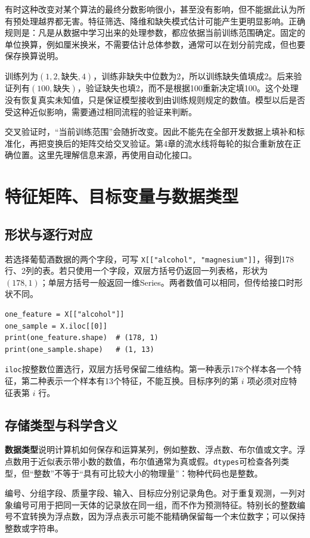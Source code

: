 有时这种改变对某个算法的最终分数影响很小，甚至没有影响，但不能据此认为所有预处理越界都无害。特征筛选、降维和缺失模式估计可能产生更明显影响。正确规则是：凡是从数据中学习出来的处理参数，都应依据当前训练范围确定。固定的单位换算，例如厘米换米，不需要估计总体参数，通常可以在划分前完成，但也要保存换算说明。

训练列为$(1,2,\text{缺失},4)$，训练非缺失中位数为2，所以训练缺失值填成2。后来验证列有$(100,\text{缺失})$，验证缺失也填2，而不是根据100重新决定填100。这个处理没有恢复真实未知值，只是保证模型接收到由训练规则规定的数值。模型以后是否受这种近似影响，需要通过相同流程的验证来判断。

交叉验证时，“当前训练范围”会随折改变。因此不能先在全部开发数据上填补和标准化，再把变换后的矩阵交给交叉验证。第4章的流水线将每轮的拟合重新放在正确位置。这里先理解信息来源，再使用自动化接口。

\section{特征矩阵、目标变量与数据类型}
\subsection{形状与逐行对应}
若选择葡萄酒数据的两个字段，可写 \texttt{X[["alcohol", "magnesium"]]}，得到178行、2列的表。若只使用一个字段，双层方括号仍返回一列表格，形状为 $(178,1)$；单层方括号一般返回一维Series。两者数值可以相同，但传给接口时形状不同。

\begin{lstlisting}[caption={用表格列选择理解一个特征和一个样本}]
one_feature = X[["alcohol"]]
one_sample = X.iloc[[0]]
print(one_feature.shape)  # (178, 1)
print(one_sample.shape)   # (1, 13)
\end{lstlisting}
\texttt{iloc}按整数位置选行，双层方括号保留二维结构。第一种表示178个样本各一个特征，第二种表示一个样本有13个特征，不能互换。目标序列的第 $i$ 项必须对应特征表第 $i$ 行。

\subsection{存储类型与科学含义}
\textbf{数据类型}说明计算机如何保存和运算某列，例如整数、浮点数、布尔值或文字。浮点数用于近似表示带小数的数值，布尔值通常为真或假。\texttt{dtypes}可检查各列类型，但“整数”不等于“具有可比较大小的物理量”：物种代码也是整数。

编号、分组字段、质量字段、输入、目标应分别记录角色。对于重复观测，一列对象编号可用于把同一天体的记录放在同一组，而不作为预测特征。特别长的整数编号不宜转换为浮点数，因为浮点表示可能不能精确保留每一个末位数字；可以保持整数或字符串。

